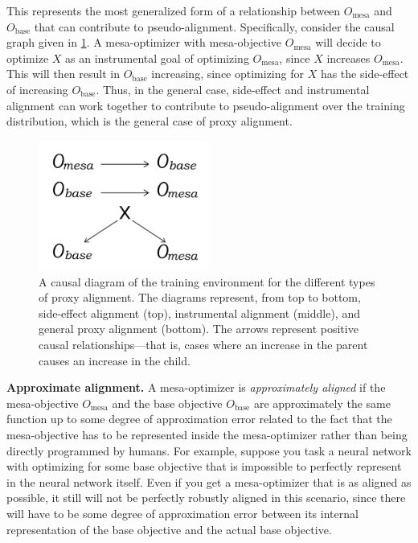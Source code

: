 \documentclass[
  onecolumn,
  natbib,
]{miri-tech-article}
\begin{document}
This represents the most generalized form of a relationship between $O_\text{mesa}$ and $O_\text{base}$ that can contribute to pseudo-alignment. Specifically, consider the causal graph given in \cref{fig:3.1}. A mesa-optimizer with mesa-objective $O_\text{mesa}$ will decide to optimize $X$ as an instrumental goal of optimizing $O_\text{mesa}$, since $X$ increases $O_\text{mesa}$. This will then result in $O_\text{base}$ increasing, since optimizing for $X$ has the side-effect of increasing $O_\text{base}$. Thus, in the general case, side-effect and instrumental alignment can work together to contribute to pseudo-alignment over the training distribution, which is the general case of proxy alignment.

\begin{figure}[h!]
  \centering
  \includegraphics[width=0.5\textwidth]{3_1.jpg}
  \caption{A causal diagram of the training environment for the different types of proxy alignment. The diagrams represent, from top to bottom, side-effect alignment (top), instrumental alignment (middle), and general proxy alignment (bottom). The arrows represent positive causal relationships---that is, cases where an increase in the parent causes an increase in the child.}
  \label{fig:3.1}
\end{figure}

\textbf{Approximate alignment.} A mesa-optimizer is \textit{approximately aligned} if the mesa-objective $O_\text{mesa}$ and the base objective $O_\text{base}$ are approximately the same function up to some degree of approximation error related to the fact that the mesa-objective has to be represented inside the mesa-optimizer rather than being directly programmed by humans. For example, suppose you task a neural network with optimizing for some base objective that is impossible to perfectly represent in the neural network itself. Even if you get a mesa-optimizer that is as aligned as possible, it still will not be perfectly robustly aligned in this scenario, since there will have to be some degree of approximation error between its internal representation of the base objective and the actual base objective.
\end{document}

